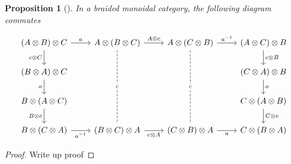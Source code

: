 \documentclass[reqno]{amsart}
\newtheorem{proposition}[theorem]{Proposition}
\theoremstyle{definition}
\theoremstyle{remark}
\begin{document}
   \begin{proposition}[]\label{braiding-gives-yang-baxter}
       In a braided monoidal category, the following
       diagram commutes

       \[\begin{tikzcd}
	{(A \otimes B) \otimes C} & {A \otimes(B \otimes C)} & {A \otimes (C \otimes B)} & {(A \otimes C) \otimes B} \\
	{(B \otimes A) \otimes C} &&& {(C \otimes A) \otimes B} \\
	{B \otimes (A \otimes C)} &&& {C \otimes (A \otimes B)} \\
	{B \otimes (C \otimes A)} & {(B \otimes C) \otimes A} & {(C \otimes B) \otimes A} & {C \otimes (B \otimes A)}
	\arrow["a", from=1-1, to=1-2]
	\arrow["{c \otimes C}"', from=1-1, to=2-1]
	\arrow["{A \otimes c}", from=1-2, to=1-3]
	\arrow["c"{description}, dashed, no head, from=1-2, to=4-2]
	\arrow["{a^{-1}}", from=1-3, to=1-4]
	\arrow["c"{description}, dashed, no head, from=1-3, to=4-3]
	\arrow["{c \otimes B}", from=1-4, to=2-4]
	\arrow["a"', from=2-1, to=3-1]
	\arrow["a", from=2-4, to=3-4]
	\arrow["{B \otimes c}"', from=3-1, to=4-1]
	\arrow["{C \otimes c}", from=3-4, to=4-4]
	\arrow["{a^{-1}}"', from=4-1, to=4-2]
	\arrow["{c \otimes A}"', from=4-2, to=4-3]
	\arrow["a"', from=4-3, to=4-4]
\end{tikzcd}\]
   \end{proposition}

   \begin{proof}
       Write up proof
   \end{proof}
\end{document}
